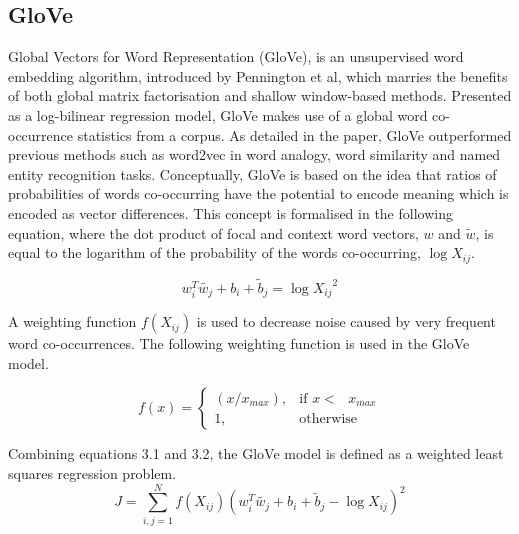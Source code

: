 \subsection{GloVe}
Global Vectors for Word Representation (GloVe), is an unsupervised word embedding algorithm, introduced by Pennington et al, which marries the benefits of both global matrix factorisation and shallow window-based methods. Presented as a log-bilinear regression model, GloVe makes use of a global word co-occurrence statistics from a corpus. As detailed in the paper, GloVe outperformed previous methods such as word2vec in word analogy, word similarity and named entity recognition tasks. Conceptually, GloVe is based on the idea that ratios of probabilities of words co-occurring have the potential to encode meaning which is encoded as vector differences. This concept is formalised in the following equation, where the dot product of focal and context word vectors, \(w\) and \(\tilde{w}\), is equal to the logarithm of the probability of the words co-occurring, \(\log{X_{ij}}\).

\begin{equation}
w_{i}^{T} \tilde{w_{j}} + b_{i} + \tilde{b}_{j} = \log{X_{ij}}^{2}
\end{equation}

\noindent
\newline
A weighting function \(f(X_{ij})\) is used to decrease noise caused by very frequent word co-occurrences. The following weighting function is used in the GloVe model.

\begin{equation}
	f(x) =
	\begin{cases}
	(x/x_{max}), & \text{if  \(x <\) } x_{max} \\
	1, & \text{otherwise}
	\end{cases}
\end{equation}

\noindent
\newline
Combining equations 3.1 and 3.2, the GloVe model is defined as a weighted least squares regression problem.
\begin{equation}
	J = \sum_{i, j=1}^{N} f(X_{ij}) (w_{i}^{T} \tilde{w_{j}} + b_{i} + \tilde{b}_{j} - \log{X_{ij}})^{2}
\end{equation}
